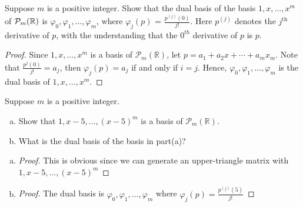 \begin{exercise}
Suppose $m$ is a positive integer. Show that the dual basis of the basis $1, x, \ldots,x^m$ of $\mathcal{P}_m(\mathbb{R})$ is $\varphi_0, \varphi_1,\ldots, \varphi_{m}$, where $\varphi_j(p)$ = $\frac{p^{(j)}(0)}{j!}$. Here $p^{(j)}$ denotes the $j^{\text{th}}$ derivative of $p$, with the understanding that the $0^{\mathit{th}}$ derivative of $p$ is $p$.
\end{exercise}
\begin{proof}
	Since $1, x, \ldots ,x^m$ is a basis of $\mathcal{P}_m(\mathbb{R})$, let $p = a_1 + a_2 x + \cdots + a_m x_m$. Note that $\frac{p^{j}(0)}{j!} = a_j$, then $\varphi_j(p) = a_j$ if and only if $i = j$. Hence, $\varphi_0, \varphi_1, \ldots, \varphi_m$ is the dual basis of $1, x, \ldots, x^m$.
\end{proof}
\begin{exercise}
Suppose $m$ is a positive integer.
\begin{enumerate}[(a)]
	\item Show that $1, x-5, \ldots , (x-5)^m$ is a basis of $\mathcal{P}_m(\mathbb{R})$.
	\item What is the dual basis of the basis in part(a)?
\end{enumerate}
\end{exercise}
\begin{enumerate}[(a)]
	\item \begin{proof}
		      This is obvious since we can generate an upper-triangle matrix with $1, x-5, \ldots , (x-5)^m$
	      \end{proof}
	\item \begin{proof}
		      The dual basis is $\varphi_0, \varphi_1, \ldots, \varphi_m$ where $\varphi_j(p) = \frac{p^{(j)}(5)}{j!}$
	      \end{proof}
\end{enumerate}

